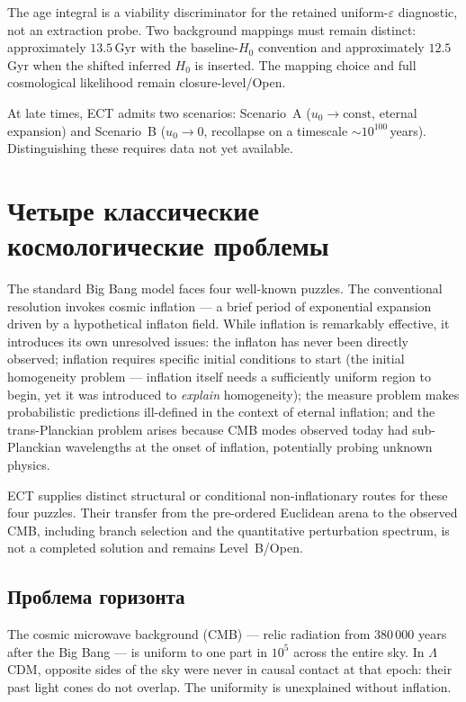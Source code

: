\documentclass[11pt,a4paper]{article}
\begin{document}
The age integral is a viability discriminator for the retained uniform-$\varepsilon$ diagnostic, not an extraction probe. Two background mappings must remain distinct: approximately $13.5$\,Gyr with the baseline-$H_0$ convention and approximately $12.5$\,Gyr when the shifted inferred $H_0$ is inserted. The mapping choice and full cosmological likelihood remain closure-level/Open.

At late times, ECT admits two scenarios: Scenario~A ($u_0 \to \text{const}$, eternal expansion) and Scenario~B ($u_0 \to 0$, recollapse on a timescale $\sim 10^{100}$\,years). Distinguishing these requires data not yet available.


\section{Четыре классические космологические проблемы}
\label{sec:pop_cosmo_problems}

The standard Big Bang model faces four well-known puzzles. The conventional resolution invokes cosmic inflation --- a brief period of exponential expansion driven by a hypothetical inflaton field. While inflation is remarkably effective, it introduces its own unresolved issues: the inflaton has never been directly observed; inflation requires specific initial conditions to start (the initial homogeneity problem --- inflation itself needs a sufficiently uniform region to begin, yet it was introduced to \emph{explain} homogeneity); the measure problem makes probabilistic predictions ill-defined in the context of eternal inflation; and the trans-Planckian problem arises because CMB modes observed today had sub-Planckian wavelengths at the onset of inflation, potentially probing unknown physics.

ECT supplies distinct structural or conditional non-inflationary routes for these four puzzles.  Their transfer from the pre-ordered Euclidean arena to the observed CMB, including branch selection and the quantitative perturbation spectrum, is not a completed solution and remains Level~B/Open.

\subsection{Проблема горизонта}

The cosmic microwave background (CMB) --- relic radiation from 380\,000 years after the Big Bang --- is uniform to one part in $10^5$ across the entire sky. In $\Lambda$CDM, opposite sides of the sky were never in causal contact at that epoch: their past light cones do not overlap. The uniformity is unexplained without inflation.
\end{document}
